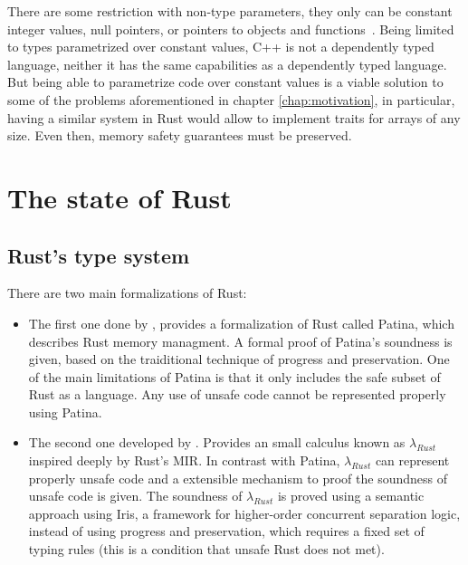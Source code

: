 There are some restriction with non-type parameters, they only can be constant
integer values, null pointers, or pointers to objects and
functions~\cite{templates}. Being limited to types parametrized over constant
values, C++ is not a dependently typed language, neither it has the same
capabilities as a dependently typed language. But being able to parametrize code
over constant values is a viable solution to some of the problems aforementioned
in chapter \ref{chap:motivation}, in particular, having a similar system in
Rust would allow to implement traits for arrays of any size. Even then, memory
safety guarantees must be preserved.

\section{The state of Rust} 

\subsection{Rust's type system}

There are two main formalizations of Rust: 

\begin{itemize} 
    
    \item The first one done by \citet{reed}, provides a formalization of Rust
        called Patina, which describes Rust memory managment. A formal proof of
        Patina's soundness is given, based on the traiditional technique of
        progress and preservation. One of the main limitations of Patina is that
        it only includes the safe subset of Rust as a language. Any use of
        unsafe code cannot be represented properly using Patina.

    \item The second one developed by \citet{ralf}. Provides an small calculus
        known as $\lambda_{Rust}$ inspired deeply by Rust's MIR. In contrast
        with Patina, $\lambda_{Rust}$ can represent properly unsafe code and a
        extensible mechanism to proof the soundness of unsafe code is given. The
        soundness of $\lambda_{Rust}$ is proved using a semantic approach using
        Iris, a framework for higher-order concurrent separation logic, instead
        of using progress and preservation, which requires a fixed set of typing
        rules (this is a condition that unsafe Rust does not met).
        
\end{itemize}

